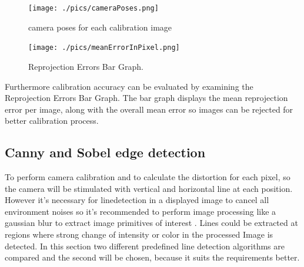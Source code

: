 \documentclass[journal,final,a4paper,twoside]{PS}
\begin{document}
\begin{figure}[h]
\centering
\parbox{4cm}{
\texttt{[image: ./pics/cameraPoses.png]}
\caption{camera poses for each calibration image\cite{Corke}}
\label{fig:cameraPose}}
\qquad
\begin{minipage}{4cm}
\texttt{[image: ./pics/meanErrorInPixel.png]}
\caption{Reprojection Errors Bar Graph.}
\label{fig:ErrorsBarGraph}
\end{minipage}
\end{figure}

Furthermore calibration accuracy can be evaluated by examining the Reprojection Errors Bar Graph. The bar graph displays the mean reprojection error per image, along with the overall mean error \cite{matlab} so images can be rejected for better calibration process.

\subsection{Canny and Sobel edge detection}
\label{sec:Canny}
To perform camera calibration and to calculate the distortion for each pixel, so the camera will be stimulated with vertical and horizontal line at each position. However it's necessary for linedetection in a displayed image to cancel all environment noises so it's recommended to perform image processing like a gaussian blur to extract image primitives of interest \cite{opencv}. 
Lines could be extracted at regions where strong change of intensity or color in the processed Image is detected. In this section two different predefined line detection algorithms are compared and the second will be chosen, because it suits the requirements better\cite{Langaniere}.
\end{document}
